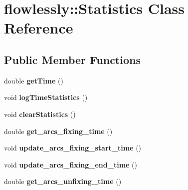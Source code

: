 \hypertarget{classflowlessly_1_1Statistics}{\section{flowlessly\-:\-:\-Statistics \-Class \-Reference}
\label{classflowlessly_1_1Statistics}
}
\subsection*{\-Public \-Member \-Functions}
\begin{DoxyCompactItemize}
\item 
\hypertarget{classflowlessly_1_1Statistics_a4d2cbee8e8d73406968aba96e9154f89}{double {\bfseries get\-Time} ()}\label{classflowlessly_1_1Statistics_a4d2cbee8e8d73406968aba96e9154f89}

\item 
\hypertarget{classflowlessly_1_1Statistics_a79babc55656fb2944ae6bdd9a23a43d3}{void {\bfseries log\-Time\-Statistics} ()}\label{classflowlessly_1_1Statistics_a79babc55656fb2944ae6bdd9a23a43d3}

\item 
\hypertarget{classflowlessly_1_1Statistics_ab68205294657219daaf584cf3ee9769c}{void {\bfseries clear\-Statistics} ()}\label{classflowlessly_1_1Statistics_ab68205294657219daaf584cf3ee9769c}

\item 
\hypertarget{classflowlessly_1_1Statistics_a422a0de153746b9daa9d55427efe3570}{double {\bfseries get\-\_\-arcs\-\_\-fixing\-\_\-time} ()}\label{classflowlessly_1_1Statistics_a422a0de153746b9daa9d55427efe3570}

\item 
\hypertarget{classflowlessly_1_1Statistics_a91902c6370fb50b420f8a0e1d338ac19}{void {\bfseries update\-\_\-arcs\-\_\-fixing\-\_\-start\-\_\-time} ()}\label{classflowlessly_1_1Statistics_a91902c6370fb50b420f8a0e1d338ac19}

\item 
\hypertarget{classflowlessly_1_1Statistics_abe8d0c971c6423384cb2e54a22d64cb0}{void {\bfseries update\-\_\-arcs\-\_\-fixing\-\_\-end\-\_\-time} ()}\label{classflowlessly_1_1Statistics_abe8d0c971c6423384cb2e54a22d64cb0}

\item 
\hypertarget{classflowlessly_1_1Statistics_abcd1e0a197070c18bf98a723b4ccac0b}{double {\bfseries get\-\_\-arcs\-\_\-unfixing\-\_\-time} ()}\label{classflowlessly_1_1Statistics_abcd1e0a197070c18bf98a723b4ccac0b}


\end{DoxyCompactItemize}
